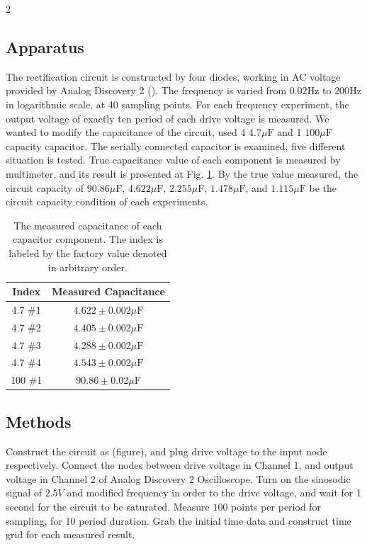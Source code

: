 \documentclass{article}
\begin{document}
\begin{multicols}{2}
\subsection{Apparatus}
The rectification circuit is constructed by four diodes, working in AC voltage provided by Analog Discovery 2 (\cite{digilent_analog_discovery}).
The frequency is varied from $0.02 \mathrm{Hz}$ to $200 \mathrm{Hz}$ in logarithmic scale, at 40 sampling points.
For each frequency experiment, the output voltage of exactly ten period of each drive voltage is measured.
We wanted to modify the capacitance of the circuit, used 4 $4.7 \mu \mathrm{F}$ and 1 $100 \mu \mathrm{F}$ capacity capacitor.
The serially connected capacitor is examined, five different situation is tested.
True capacitance value of each component is measured by multimeter, and its result is presented at Fig. \ref{table: capacity data}.
By the true value measured, the circuit capacity of $90.86 \mu \mathrm{F}$, $4.622 \mu \mathrm{F}$, $2.255 \mu \mathrm{F}$, $1.478 \mu \mathrm{F}$, and $1.115 \mu \mathrm{F}$ be the circuit capacity condition of each experiments.

\begin{table}[H]
    \centering
    \begin{tabular}{c|c}
        \textbf{Index} & \textbf{Measured Capacitance} \\ 
        \hline
        \hline
        4.7 \#1 & $4.622 \pm 0.002 \mu \mathrm{F}$ \\ 
        \hline
        4.7 \#2 & $4.405 \pm 0.002 \mu \mathrm{F}$ \\
        \hline
        4.7 \#3 & $4.288 \pm 0.002 \mu \mathrm{F}$ \\
        \hline
        4.7 \#4 & $4.543 \pm 0.002 \mu \mathrm{F}$ \\
        \hline
        100 \#1 & $90.86 \pm 0.02 \mu \mathrm{F}$ \\
        \hline
    \end{tabular}
    \caption{
        The measured capacitance of each capacitor component.
        The index is labeled by the factory value denoted in arbitrary order.
    }
    \label{table: capacity data}
\end{table}

\subsection{Methods}
 Construct the circuit as (figure), and plug drive voltage to the input node respectively.
 Connect the nodes between drive voltage in Channel 1, and output voltage in Channel 2 of Analog Discovery 2 Oscilloscope.
 Turn on the sinosodic signal of $2.5V$ and modified frequency in order to the drive voltage, and wait for 1 second for the circuit to be saturated.
 Measure $100$ points per period for sampling, for 10 period duration.
 Grab the initial time data and construct time grid for each measured result.


\end{multicols}
\end{document}
